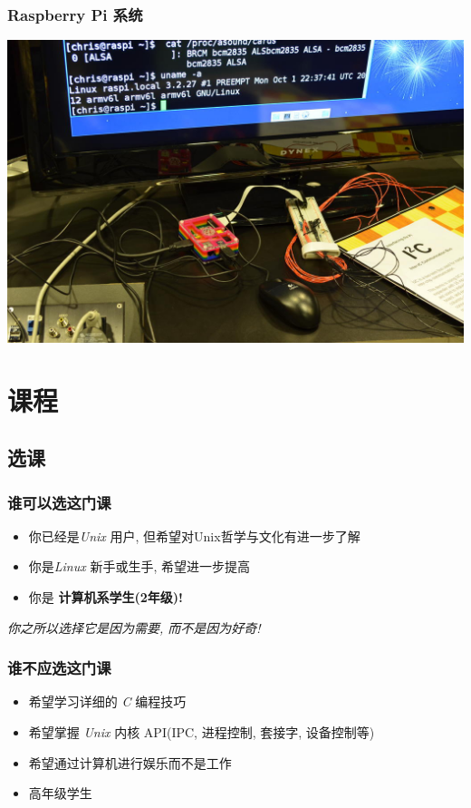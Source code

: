 \documentclass[compress]{beamer}
\begin{document}
\begin{frame}
\frametitle{Raspberry Pi 系统}
\includegraphics[width=0.9\hsize]{RaspberryPiSystem.JPG}
\end{frame}

\section{课程}

\subsection{选课}

\begin{frame}
\frametitle{谁可以选这门课}
\begin{itemize}
    \item 你已经是\emph{Unix} 用户, 但希望对Unix哲学与文化有进一步了解 
    \item 你是\emph{Linux} 新手或生手, 希望进一步提高
    \item 你是 \bfseries{计算机系学生(2年级)}!
\end{itemize}
\emph{你之所以选择它是因为需要, 而不是因为好奇!} 
\end{frame}

\begin{frame}
\frametitle{谁不应选这门课}
\begin{itemize}
    \item 希望学习详细的 \emph{C} 编程技巧
    \item 希望掌握 \emph{Unix} 内核 API(IPC, 进程控制, 套接字, 设备控制等)
    \item 希望通过计算机进行娱乐而不是工作
	\item 高年级学生
\end{itemize}
\end{frame}
\end{document}
